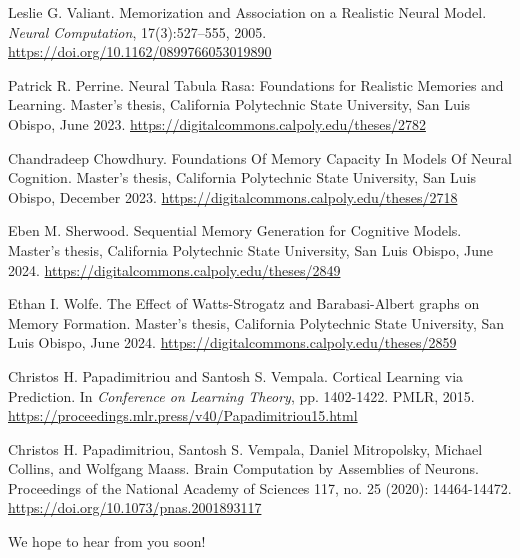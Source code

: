 \documentclass{article}
\begin{document}
\begin{thebibliography}{9}
\makeatletter
\addtocounter{\@listctr}{1}
\makeatother

Leslie G. Valiant. Memorization and Association on a Realistic Neural Model. \textit{Neural Computation}, 17(3):527–555, 2005. \url{https://doi.org/10.1162/0899766053019890}

Patrick R. Perrine. Neural Tabula Rasa: Foundations for Realistic Memories and Learning. Master’s thesis, California Polytechnic State University, San Luis Obispo, June 2023. \url{https://digitalcommons.calpoly.edu/theses/2782}

Chandradeep Chowdhury. Foundations Of Memory Capacity In Models Of Neural Cognition. Master’s thesis, California Polytechnic State University, San Luis Obispo, December 2023. \url{https://digitalcommons.calpoly.edu/theses/2718}

Eben M. Sherwood. Sequential Memory Generation for Cognitive Models. Master’s thesis, California Polytechnic State University, San Luis Obispo, June 2024. \url{https://digitalcommons.calpoly.edu/theses/2849}%

Ethan I. Wolfe. The Effect of Watts-Strogatz and Barabasi-Albert graphs on Memory Formation. Master’s thesis, California Polytechnic State University, San Luis Obispo, June 2024. \url{https://digitalcommons.calpoly.edu/theses/2859}%

Christos H. Papadimitriou and Santosh S. Vempala. Cortical Learning via Prediction. In \textit{Conference on Learning Theory}, pp. 1402-1422. PMLR, 2015. \url{https://proceedings.mlr.press/v40/Papadimitriou15.html}

Christos H. Papadimitriou, Santosh S. Vempala, Daniel Mitropolsky, Michael Collins, and Wolfgang Maass. Brain Computation by Assemblies of Neurons. Proceedings of the National Academy of Sciences 117, no. 25 (2020): 14464-14472. \url{https://doi.org/10.1073/pnas.2001893117}


\end{thebibliography} 

\vspace{1.5cm}
\begin{center}
{\Large{We hope to hear from you soon!}}
\end{center}
\end{document}
